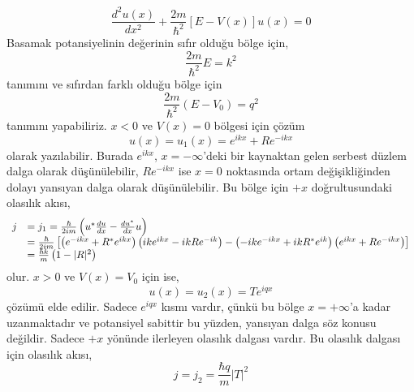 \documentclass[a4paper,12pt, twoside]{article}
\begin{document}
\begin{equation}
\frac { d ^ { 2 } u ( x ) } { d x ^ { 2 } } + \frac { 2 m } { \hbar ^ { 2 } } [ E - V ( x ) ] u ( x ) = 0
\end{equation}
Basamak potansiyelinin değerinin sıfır olduğu bölge için,
\begin{equation}
\frac { 2 m} { \hbar ^ { 2 } } E = k ^ { 2 }
\end{equation}
tanımını ve sıfırdan farklı olduğu bölge için
\begin{equation}
\frac { 2 m} { \hbar ^ { 2 } }  \left( E - V _ { 0 } \right) = q ^ { 2 }
\end{equation}
tanımını yapabiliriz. $x<0$ ve $V(x)=0$ bölgesi için çözüm
\begin{equation}
u ( x ) = u_1 ( x ) = e ^ { i k x } + R e ^ { - i k x }
\end{equation}
olarak yazılabilir. Burada $e ^ { i k x }$, $x=-\infty$'deki bir kaynaktan gelen serbest düzlem dalga olarak düşünülebilir, $R e ^ { -i k x }$ ise $x=0$ noktasında ortam değişikliğinden dolayı yansıyan dalga olarak düşünülebilir. Bu bölge için $+x$ doğrultusundaki olasılık akısı,
\begin{equation}
\begin{array} { r l } 
{ j } &= { j_1 } = \frac { \hbar } { 2 i m } \left( u ^ { * } \frac { d u } { d x } - \frac { d u ^ { * } } { d x } u \right) \\
& = \frac { \hbar } { 2 i m } \left[ \left( e ^ { - i k x } + R ^ { * } e ^ { i k x } \right) \left( i k e ^ { i k x } - i k R e ^ { - i k } \right) - \left( -i k e ^ { -i k x } + i k R^* e ^ {  i k } \right) \left( e ^ { i k x } + R  e ^ { -i k x } \right)  \right]  \\ 
{ } & { = \frac { \hbar k } { m } \left( 1 - | R | ^ { 2 } \right) } \end{array}
\end{equation}
olur. $x>0$ ve $V(x)=V_0$ için ise,
\begin{equation}
u ( x ) = u_2 ( x ) = T e ^ { i q x }
\end{equation}
çözümü elde edilir. Sadece $e ^ { i q x }$ kısmı vardır, çünkü bu bölge $x=+\infty$'a kadar uzanmaktadır ve potansiyel sabittir bu yüzden, yansıyan dalga söz konusu değildir. Sadece $+x$ yönünde ilerleyen olasılık dalgası vardır. Bu olasılık dalgası için olasılık akısı,
\begin{equation}
j = j_2 = \frac { \hbar q } { m } | T | ^ { 2 }
\end{equation}
\end{document}
